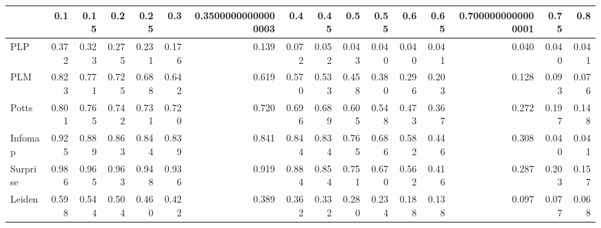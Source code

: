 \begin{tabular}{lrrrrrrrrrrrrrrr}
\toprule
{} &   0.1 &  0.15 &   0.2 &  0.25 &   0.3 & 0.35000000000000003 &   0.4 &  0.45 &   0.5 &  0.55 &   0.6 &  0.65 & 0.7000000000000001 &  0.75 &   0.8 \\
\midrule
PLP      & 0.372 & 0.323 & 0.275 & 0.231 & 0.176 &               0.139 & 0.072 & 0.052 & 0.043 & 0.040 & 0.040 & 0.041 &              0.040 & 0.040 & 0.041 \\
PLM      & 0.823 & 0.771 & 0.725 & 0.688 & 0.642 &               0.619 & 0.570 & 0.533 & 0.458 & 0.380 & 0.296 & 0.203 &              0.128 & 0.093 & 0.076 \\
Potts    & 0.801 & 0.765 & 0.742 & 0.731 & 0.720 &               0.720 & 0.696 & 0.689 & 0.605 & 0.548 & 0.473 & 0.367 &              0.272 & 0.197 & 0.148 \\
Infomap  & 0.925 & 0.889 & 0.863 & 0.844 & 0.839 &               0.841 & 0.844 & 0.834 & 0.765 & 0.686 & 0.582 & 0.446 &              0.308 & 0.040 & 0.041 \\
Surprise & 0.986 & 0.965 & 0.963 & 0.948 & 0.936 &               0.919 & 0.884 & 0.854 & 0.751 & 0.670 & 0.562 & 0.416 &              0.287 & 0.203 & 0.157 \\
Leiden   & 0.598 & 0.544 & 0.504 & 0.460 & 0.422 &               0.389 & 0.362 & 0.332 & 0.280 & 0.234 & 0.188 & 0.138 &              0.097 & 0.077 & 0.068 \\
\bottomrule
\end{tabular}
